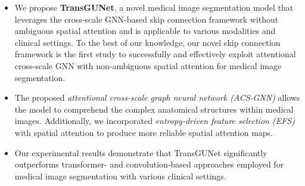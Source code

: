 \begin{itemize}
    \item We propose \textbf{TransGUNet}, a novel medical image segmentation model that leverages the cross-scale GNN-based skip connection framework without ambiguous spatial attention and is applicable to various modalities and clinical settings. To the best of our knowledge, our novel skip connection framework is the first study to successfully and effectively exploit attentional cross-scale GNN with non-ambiguous spatial attention for medical image segmentation.

    \item The proposed \textit{attentional cross-scale graph neural network (ACS-GNN)} allows the model to comprehend the complex anatomical structures within medical images. Additionally, we incorporated \textit{entropy-driven feature selection (EFS)} with spatial attention to produce more reliable spatial attention maps.

    \item Our experimental results demonstrate that TransGUNet significantly outperforms transformer- and convolution-based approaches employed for medical image segmentation with various clinical settings.
\end{itemize}
